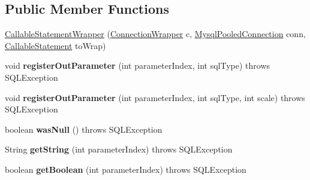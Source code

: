 \subsection*{Public Member Functions}
\begin{DoxyCompactItemize}
\item 
\mbox{\hyperlink{classcom_1_1mysql_1_1cj_1_1jdbc_1_1_callable_statement_wrapper_a60a04ffa9e3517620a85c8c64169050f}{Callable\+Statement\+Wrapper}} (\mbox{\hyperlink{classcom_1_1mysql_1_1cj_1_1jdbc_1_1_connection_wrapper}{Connection\+Wrapper}} c, \mbox{\hyperlink{classcom_1_1mysql_1_1cj_1_1jdbc_1_1_mysql_pooled_connection}{Mysql\+Pooled\+Connection}} conn, \mbox{\hyperlink{classcom_1_1mysql_1_1cj_1_1jdbc_1_1_callable_statement}{Callable\+Statement}} to\+Wrap)
\item 
\mbox{\label{classcom_1_1mysql_1_1cj_1_1jdbc_1_1_callable_statement_wrapper_aae06c94e8cf571f5349751c14df82160}} 
void {\bfseries register\+Out\+Parameter} (int parameter\+Index, int sql\+Type)  throws S\+Q\+L\+Exception 
\item 
\mbox{\label{classcom_1_1mysql_1_1cj_1_1jdbc_1_1_callable_statement_wrapper_a4de616b8da8f3443d0920d13442e81ed}} 
void {\bfseries register\+Out\+Parameter} (int parameter\+Index, int sql\+Type, int scale)  throws S\+Q\+L\+Exception 
\item 
\mbox{\label{classcom_1_1mysql_1_1cj_1_1jdbc_1_1_callable_statement_wrapper_a22610654afb6f387f1b2cec382db2d77}} 
boolean {\bfseries was\+Null} ()  throws S\+Q\+L\+Exception 
\item 
\mbox{\label{classcom_1_1mysql_1_1cj_1_1jdbc_1_1_callable_statement_wrapper_a7fde9ad7a833b2c7ba285efaf7dabc7a}} 
String {\bfseries get\+String} (int parameter\+Index)  throws S\+Q\+L\+Exception 
\item 
\mbox{\label{classcom_1_1mysql_1_1cj_1_1jdbc_1_1_callable_statement_wrapper_ad8b6b2d6283febac1be43695a2ba4fe6}} 
boolean {\bfseries get\+Boolean} (int parameter\+Index)  throws S\+Q\+L\+Exception 
\item 

\end{DoxyCompactItemize}
